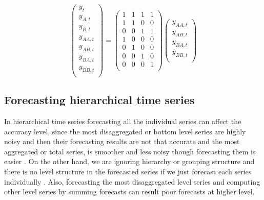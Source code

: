 \documentclass[11pt,a4paper,]{article}
\begin{document}
\[
\left(\begin{array}{c} 
y_{t}\\y_{A,t}\\y_{B,t}\\y_{AA,t}\\y_{AB,t}\\y_{BA,t}\\y_{BB,t}\\
\end{array}\right)
=\left(\begin{array}{cccc} 
1&1&1&1\\1&1&0&0\\0&0&1&1\\1&0&0&0\\0&1&0&0\\0&0&1&0\\0&0&0&1\\
\end{array}\right)
\left(\begin{array}{c} 
y_{AA,t}\\y_{AB,t}\\y_{BA,t}\\y_{BB,t}\\
\end{array}\right)
\]

\subsection{Forecasting hierarchical time
series}\label{forecasting-hierarchical-time-series}

In hierarchical time series forecasting all the individual series can
affect the accuracy level, since the most disaggregated or bottom level
series are highly noisy and then their forecasting results are not that
accurate and the most aggregated or total series, is smoother and less
noisy though forecasting them is easier
\autocite{fliedner2001hierarchical}. On the other hand, we are ignoring
hierarchy or grouping structure and there is no level structure in the
forecasted series if we just forecast each series individually
\autocite{hyndman2016fast}. Also, forecasting the most disaggregated
level series and computing other level series by summing forecasts can
result poor forecasts at higher level.
\end{document}
